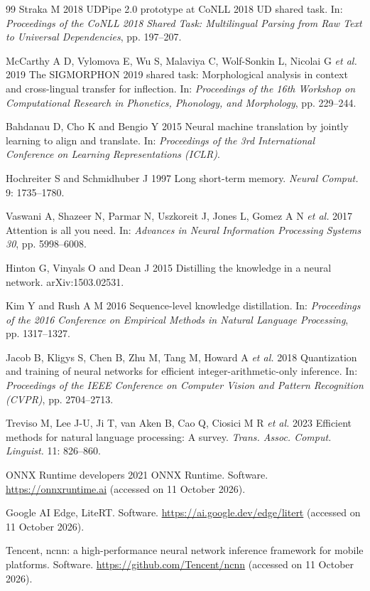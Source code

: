 \documentclass{sadhana}
\begin{document}
\begin{thebibliography}{99}
Straka M 2018 UDPipe 2.0 prototype at CoNLL 2018 UD shared task. In:
\emph{Proceedings of the CoNLL 2018 Shared Task: Multilingual Parsing from Raw
Text to Universal Dependencies}, pp. 197--207.

McCarthy A D, Vylomova E, Wu S, Malaviya C, Wolf-Sonkin L, Nicolai G
\emph{et al.} 2019 The SIGMORPHON 2019 shared task: Morphological analysis in
context and cross-lingual transfer for inflection. In: \emph{Proceedings of
the 16th Workshop on Computational Research in Phonetics, Phonology, and
Morphology}, pp. 229--244. %

Bahdanau D, Cho K and Bengio Y 2015 Neural machine translation by jointly
learning to align and translate. In: \emph{Proceedings of the 3rd
International Conference on Learning Representations (ICLR)}.

Hochreiter S and Schmidhuber J 1997 Long short-term memory. \emph{Neural
Comput.} 9: 1735--1780.

Vaswani A, Shazeer N, Parmar N, Uszkoreit J, Jones L, Gomez A N \emph{et al.}
2017 Attention is all you need. In: \emph{Advances in Neural Information
Processing Systems 30}, pp. 5998--6008.

Hinton G, Vinyals O and Dean J 2015 Distilling the knowledge in a neural
network. arXiv:1503.02531.

Kim Y and Rush A M 2016 Sequence-level knowledge distillation. In:
\emph{Proceedings of the 2016 Conference on Empirical Methods in Natural
Language Processing}, pp. 1317--1327.

Jacob B, Kligys S, Chen B, Zhu M, Tang M, Howard A \emph{et al.} 2018
Quantization and training of neural networks for efficient
integer-arithmetic-only inference. In: \emph{Proceedings of the IEEE
Conference on Computer Vision and Pattern Recognition (CVPR)},
pp. 2704--2713.

Treviso M, Lee J-U, Ji T, van Aken B, Cao Q, Ciosici M R \emph{et al.} 2023
Efficient methods for natural language processing: A survey. \emph{Trans.
Assoc. Comput. Linguist.} 11: 826--860.

ONNX Runtime developers 2021 ONNX Runtime. Software.
\url{https://onnxruntime.ai} (accessed on 11 October 2026).

Google AI Edge, LiteRT. Software. \url{https://ai.google.dev/edge/litert}
(accessed on 11 October 2026).

Tencent, ncnn: a high-performance neural network inference framework for
mobile platforms. Software. \url{https://github.com/Tencent/ncnn} (accessed on
11 October 2026).

\end{thebibliography}
\end{document}
